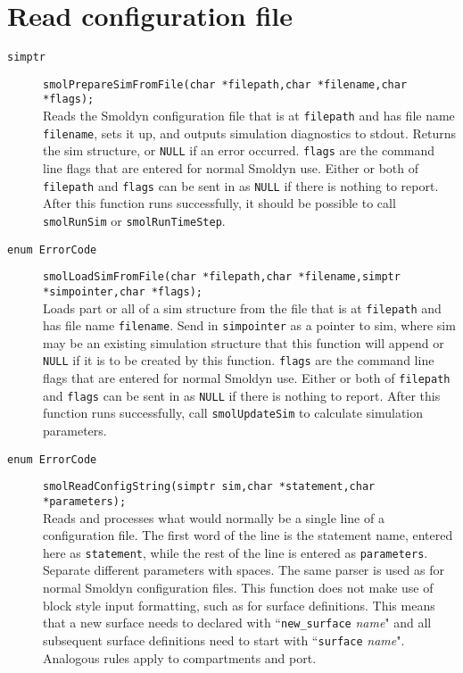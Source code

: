 \documentclass {book}
\begin{document}
\section{Read configuration file}

\begin{description}

\item[\texttt{simptr}]
\texttt{smolPrepareSimFromFile(char *filepath,char *filename,char *flags);}
\hfill \\
Reads the Smoldyn configuration file that is at \texttt{filepath} and has file name \texttt{filename}, sets it up, and outputs simulation diagnostics to stdout.  Returns the sim structure, or \texttt{NULL} if an error occurred.  \texttt{flags} are the command line flags that are entered for normal Smoldyn use.  Either or both of \texttt{filepath} and \texttt{flags} can be sent in as \texttt{NULL} if there is nothing to report.  After this function runs successfully, it should be possible to call \texttt{smolRunSim} or \texttt{smolRunTimeStep}.

\item[\texttt{enum ErrorCode}]
\texttt{smolLoadSimFromFile(char *filepath,char *filename,simptr *simpointer,char *flags);}
\hfill \\
Loads part or all of a sim structure from the file that is at \texttt{filepath} and has file name \texttt{filename}.  Send in \texttt{simpointer} as a pointer to sim, where sim may be an existing simulation structure that this function will append or \texttt{NULL} if it is to be created by this function.  \texttt{flags} are the command line flags that are entered for normal Smoldyn use.  Either or both of \texttt{filepath} and \texttt{flags} can be sent in as \texttt{NULL} if there is nothing to report.  After this function runs successfully, call \texttt{smolUpdateSim} to calculate simulation parameters.

\item[\texttt{enum ErrorCode}]
\texttt{smolReadConfigString(simptr sim,char *statement,char *parameters);}
\hfill \\
Reads and processes what would normally be a single line of a configuration file.  The first word of the line is the statement name, entered here as \texttt{statement}, while the rest of the line is entered as \texttt{parameters}.  Separate different parameters with spaces.  The same parser is used as for normal Smoldyn configuration files.  This function does not make use of block style input formatting, such as for surface definitions.  This means that a new surface needs to declared with ``\texttt{new\_surface} \emph{name}" and all subsequent surface definitions need to start with ``\texttt{surface} \emph{name}".  Analogous rules apply to compartments and port.

\end{description}
\end{document}
